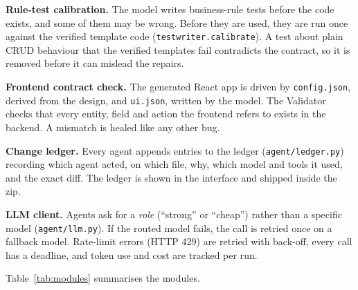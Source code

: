 \documentclass[12pt,a4paper]{report}
\begin{document}
\textbf{Rule-test calibration.} The model writes business-rule tests before the code exists, and some of them may be wrong. Before they are used, they are run once against the verified template code (\texttt{testwriter.calibrate}). A test about plain CRUD behaviour that the verified templates fail contradicts the contract, so it is removed before it can mislead the repairs.

\textbf{Frontend contract check.} The generated React app is driven by \texttt{config.json}, derived from the design, and \texttt{ui.json}, written by the model. The Validator checks that every entity, field and action the frontend refers to exists in the backend. A mismatch is healed like any other bug.

\textbf{Change ledger.} Every agent appends entries to the ledger (\texttt{agent/ledger.py}) recording which agent acted, on which file, why, which model and tools it used, and the exact diff. The ledger is shown in the interface and shipped inside the zip.

\textbf{LLM client.} Agents ask for a \emph{role} (``strong'' or ``cheap'') rather than a specific model (\texttt{agent/llm.py}). If the routed model fails, the call is retried once on a fallback model. Rate-limit errors (HTTP 429) are retried with back-off, every call has a deadline, and token use and cost are tracked per run.

Table~\ref{tab:modules} summarises the modules.
\end{document}

